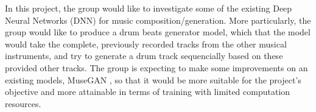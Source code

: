 \begin{par}
    \par \hspace{15pt} In this project, the group would like to investigate some of the existing Deep Neural Networks (DNN) for music composition/generation. More particularly, the group would like to produce a drum beats generator model, which that the model would take the complete, previously recorded tracks from the other musical instruments, and try to generate a drum track sequencially based on these provided other tracks. The group is expecting to make some improvements on an existing models, MuseGAN \cite{musegan}, so that it would be more suitable for the project's objective and more attainable in terms of training with limited computation resources.   
\end{par}